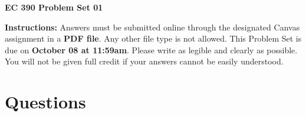 \documentclass[12pt]{exam}
\newcommand{\examdate}{\fontfamily{lmss} \textbf{October 08 at 11:59am}}
\begin{document}
\selectfont

\begin{center}
    \textbf{{\LARGE EC 390 Problem Set 01}} \\
    \bigskip 
\end{center}

\noindent \textbf{Instructions:} 
Answers must be submitted online through the designated Canvas assignment in a \textbf{PDF file}.
Any other file type is not allowed. 
This Problem Set is due on \examdate.
Please write as legible and clearly as possible. 
You will not be given full credit if your answers cannot be easily understood. 

\section*{Questions}
\end{document}
